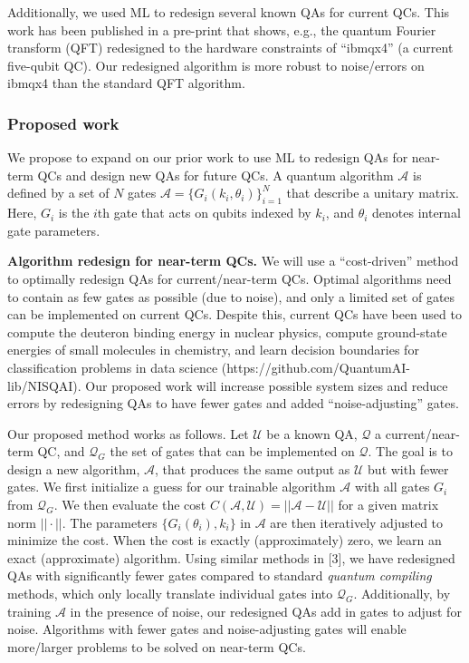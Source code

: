 \documentclass[10pt]{article}
\begin{document}
Additionally, we used ML to redesign several known QAs for current QCs. This work has been published in a pre-print \cite{Khatri2018} that shows, e.g., the quantum Fourier transform (QFT) redesigned to the hardware constraints of ``ibmqx4'' (a current five-qubit QC). Our redesigned algorithm is more robust to noise/errors on ibmqx4 than the standard QFT algorithm.


\subsubsection{Proposed work} We propose to expand on our prior work to use ML to redesign QAs for near-term QCs and design new QAs for future QCs. A quantum algorithm $\mathcal{A}$ is defined by a set of $N$ gates $\mathcal{A} = \{ G_i(k_i, \theta_i)\}_{i = 1}^{N}$ that describe a unitary matrix. Here, $G_i$ is the $i$th gate that acts on qubits indexed by $k_i$, and $\theta_i$ denotes internal gate parameters.

\textbf{Algorithm redesign for near-term QCs.} We will use a ``cost-driven'' method to optimally redesign QAs for current/near-term QCs. Optimal algorithms need to contain as few gates as possible (due to noise), and only a limited set of gates can be implemented on current QCs. Despite this, current QCs have been used to compute the deuteron binding energy in nuclear physics, compute ground-state energies of small molecules in chemistry, and learn decision boundaries for classification problems in data science (https://github.com/QuantumAI-lib/NISQAI). Our proposed work will increase possible system sizes and reduce errors by redesigning QAs to have fewer gates and added ``noise-adjusting'' gates.


Our proposed method works as follows. Let $\mathcal{U}$ be a known QA, $\mathcal{Q}$ a current/near-term QC, and $\mathcal{Q}_G$ the set of gates that can be implemented on $\mathcal{Q}$. The goal is to design a new algorithm, $\mathcal{A}$, that produces the same output as $\mathcal{U}$ but with fewer gates. We first initialize a guess for our trainable algorithm $\mathcal{A}$ with all gates $G_i$ from $\mathcal{Q}_G$. We then evaluate the cost $C(\mathcal{A}, \mathcal{U}) = || \mathcal{A} -  \mathcal{U} ||$ for a given matrix norm $|| \cdot ||$. The parameters $\{G_i(\theta_i), k_i\}$ in $\mathcal{A}$ are then iteratively adjusted to minimize the cost. When the cost is exactly (approximately) zero, we learn an exact (approximate) algorithm. Using similar methods in [3], we have redesigned QAs with significantly fewer gates compared to standard \textit{quantum compiling} methods, which only locally translate individual gates into $\mathcal{Q}_G$. Additionally, by training $\mathcal{A}$ in the presence of noise, our redesigned QAs add in gates to adjust for noise. Algorithms with fewer gates and noise-adjusting gates will enable more/larger problems to be solved on near-term QCs.
\end{document}
